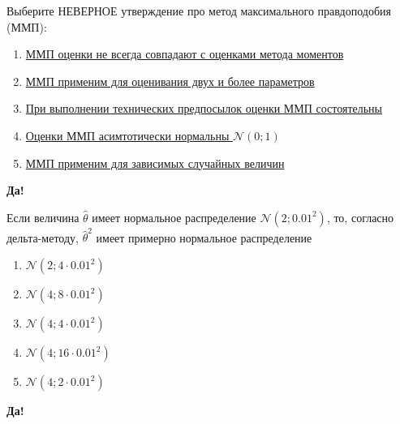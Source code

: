 \documentclass[t]{beamer}
\newcommand{\cN}{\mathcal{N}}
\begin{document}
 \begin{frame} \label{30-Yes} 
\begin{block}{30} 

  Выберите НЕВЕРНОЕ утверждение про метод максимального правдоподобия (ММП):
  


 \end{block} 
\begin{enumerate} 
\item[] \hyperlink{30-No}{\beamergotobutton{} ММП оценки не всегда совпадают с оценками метода моментов}
\item[] \hyperlink{30-No}{\beamergotobutton{} ММП применим для оценивания двух и более параметров}
\item[] \hyperlink{30-No}{\beamergotobutton{} При выполнении технических предпосылок оценки ММП состоятельны}
\item[] \hyperlink{30-Yes}{\beamergotobutton{} Оценки ММП асимтотически нормальны $\cN(0;1)$}
\item[] \hyperlink{30-No}{\beamergotobutton{} ММП применим для зависимых случайных величин}
\end{enumerate} 

 \textbf{Да!} 
 \hyperlink{31}{}\end{frame} 


 \begin{frame} \label{31-Yes} 
\begin{block}{31} 

  Если величина $\hat\theta$ имеет нормальное распределение $\cN(2;0.01^2)$, то, согласно дельта-методу, $\hat\theta^2$ имеет примерно нормальное распределение
  


 \end{block} 
\begin{enumerate} 
\item[] \hyperlink{31-No}{\beamergotobutton{} $\cN(2;4\cdot 0.01^2)$}
\item[] \hyperlink{31-No}{\beamergotobutton{} $\cN(4;8\cdot 0.01^2)$}
\item[] \hyperlink{31-No}{\beamergotobutton{} $\cN(4;4\cdot 0.01^2)$}
\item[] \hyperlink{31-Yes}{\beamergotobutton{} $\cN(4;16\cdot 0.01^2)$}
\item[] \hyperlink{31-No}{\beamergotobutton{} $\cN(4;2\cdot 0.01^2)$}
\end{enumerate} 

 \textbf{Да!} 
 \hyperlink{32}{}\end{frame} 
\end{document}
